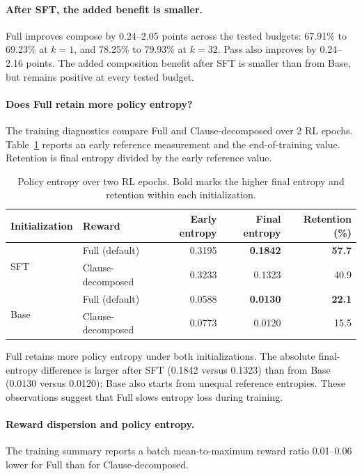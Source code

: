 \paragraph{After SFT, the added benefit is smaller.}
Full improves compose by 0.24--2.05 points across the tested budgets:
67.91\% to 69.23\% at \(k=1\), and 78.25\% to 79.93\% at \(k=32\).
Pass also improves by 0.24--2.16 points. The added composition benefit after
SFT is smaller than from Base, but remains positive at every tested budget.

\paragraph{Does Full retain more policy entropy?}

The training diagnostics compare Full and Clause-decomposed over
2 RL epochs. Table~\ref{tab:shapley-entropy} reports an early reference
measurement and the end-of-training value. Retention is final entropy
divided by the early reference value.

\begin{table}[H]
\centering
\small
\caption{Policy entropy over two RL epochs. Bold marks the higher final entropy and retention within each initialization.}
\label{tab:shapley-entropy}
\begin{tabular}{llrrr}
\toprule
\rowcolor{algobg}
Initialization & Reward & Early entropy & Final entropy & Retention (\%) \\
\midrule
\multirow{2}{*}{SFT} & Full (default) & 0.3195 & \textbf{0.1842} & \textbf{57.7} \\
 & Clause-decomposed & 0.3233 & 0.1323 & 40.9 \\
\midrule
\multirow{2}{*}{Base} & Full (default) & 0.0588 & \textbf{0.0130} & \textbf{22.1} \\
 & Clause-decomposed & 0.0773 & 0.0120 & 15.5 \\
\bottomrule
\end{tabular}
\end{table}

Full retains more policy entropy under both initializations. The absolute
final-entropy difference is larger after SFT (0.1842 versus 0.1323) than
from Base (0.0130 versus 0.0120); Base also starts from unequal reference
entropies. These observations suggest that Full slows entropy loss during
training.

\paragraph{Reward dispersion and policy entropy.}
The training summary reports a batch mean-to-maximum reward ratio
0.01--0.06 lower for Full than for Clause-decomposed.

